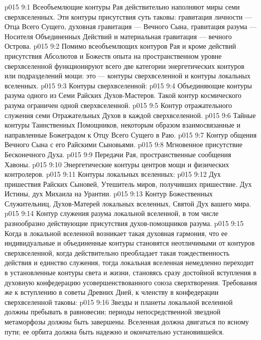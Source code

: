 \vs p015 9:1 Всеобъемлющие контуры Рая действительно наполняют миры семи сверхвселенных. Эти контуры присутствия суть таковы: гравитация личности --- Отца Всего Сущего, духовная гравитация --- Вечного Сына, гравитация разума --- Носителя Объединенных Действий и материальная гравитация --- вечного Острова.
\vs p015 9:2 Помимо всеобъемлющих контуров Рая и кроме действий присутствия Абсолютов и Божеств опыта на пространственном уровне сверхвселенной функционируют всего две категории энергетических контуров или подразделений мощи: это --- контуры сверхвселенной и контуры локальных вселенных.
\vs p015 9:3 \pc Контуры сверхвселенной:
\vs p015 9:4 \bibnobreakspace Объединяющие контуры разума одного из Семи Райских Духов\hyp{}Мастеров. Такой контур космического разума ограничен одной сверхвселенной.
\vs p015 9:5 \bibnobreakspace Контур отражательного служения семи Отражательных Духов в каждой сверхвселенной.
\vs p015 9:6 \bibnobreakspace Тайные контуры Таинственных Помощников, некоторым образом взаимосвязанные и направленные Божеградом к Отцу Всего Сущего в Раю.
\vs p015 9:7 \bibnobreakspace Контур общения Вечного Сына с его Райскими Сыновьями.
\vs p015 9:8 \bibnobreakspace Мгновенное присутствие Бесконечного Духа.
\vs p015 9:9 \bibnobreakspace Передачи Рая, пространственные сообщения Хавоны.
\vs p015 9:10 \bibnobreakspace Энергетические контуры центров мощи и физических контролеров.
\vs p015 9:11 \pc Контуры локальных вселенных:
\vs p015 9:12 \pc {}\bibnobreakspace Дух пришествия Райских Сыновей, Утешитель миров, получивших пришествие. Дух Истины, дух Михаила на Урантии.
\vs p015 9:13 \bibnobreakspace Контур Божественных Служительниц, Духов\hyp{}Матерей локальных вселенных, Святой Дух вашего мира.
\vs p015 9:14 \bibnobreakspace Контур служения разума локальной вселенной, в том числе разнообразно действующие присутствия духов\hyp{}помощников разума.
\vs p015 9:15 \pc Когда в локальной вселенной возникает такая духовная гармония, что ее индивидуальные и объединенные контуры становятся неотличимыми от контуров сверхвселенной, когда действительно преобладает такая тождественность действия и единство служения, тогда локальная вселенная немедленно переходит в установленные контуры света и жизни, становясь сразу достойной вступления в духовную конфедерацию усовершенствованного союза сверхтворения. Требования же к вступлению в советы Древних Дней, к членству в конфедерации сверхвселенной таковы:
\vs p015 9:16 \bibnobreakspace {} Звезды и планеты локальной вселенной должны пребывать в равновесии; периоды непосредственной звездной метаморфозы должны быть завершены. Вселенная должна двигаться по ясному пути; ее орбита должна быть надежно и окончательно установившейся.
